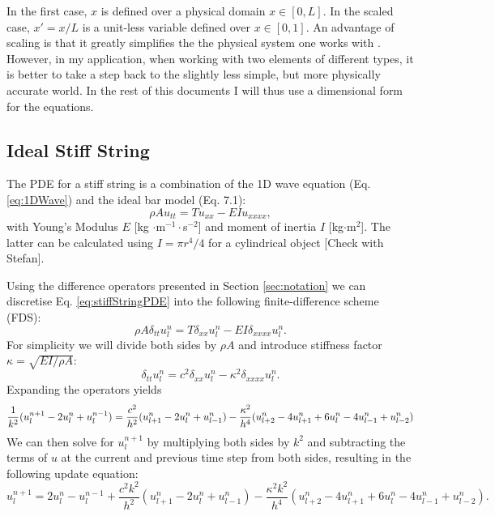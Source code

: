 \documentclass{article}
\begin{document}
In the first case, $x$ is defined over a physical domain $x\in[0,L]$. In the scaled case, $x' = x/L$ is a unit-less variable defined over $x\in[0,1]$. An advantage of scaling is that it greatly simplifies the the physical system one works with \cite{Bilbao2009}. However, in my application, when working with two  elements of different types, it is better to take a step back to the slightly less simple, but more physically accurate world. In the rest of this documents I will thus use a dimensional form for the equations.

\subsection{Ideal Stiff String}
The PDE for a stiff string is a combination of the 1D wave equation (Eq. \eqref{eq:1DWave}) and the ideal bar model (Eq. 7.1):
\begin{equation}\label{eq:stiffStringPDE}
    \rho A u_{tt} = T u_{xx} - EI u_{xxxx},
\end{equation}
with Young's Modulus $E$ [kg $\cdot$m$^{-1} \cdot$s$^{-2}$] and moment of inertia $I$ [kg$\cdot$m$^2$]. The latter can be calculated using $I = \pi r^4/4$ for a cylindrical object [Check with Stefan].

Using the difference operators presented in Section \ref{sec:notation} we can discretise Eq. \eqref{eq:stiffStringPDE} into the following finite-difference scheme (FDS):
\begin{equation}\label{eq:stiffStringFDS}
    \rho A \delta_{tt}u_l^n = T \delta_{xx} u_l^n - EI \delta_{xxxx} u_l^n.
\end{equation}
For simplicity we will divide both sides by $\rho A$ and introduce stiffness factor $\kappa = \sqrt{EI/\rho A}$:
\begin{equation}\label{eq:stiffStringFDSVars}
   \delta_{tt}u_l^n = c^2 \delta_{xx} u_l^n - \kappa^2 \delta_{xxxx} u_l^n.
\end{equation}
Expanding the operators yields
\begin{equation}
    \frac{1}{k^2}(u_l^{n+1}-2u_l^n+u_l^{n-1}) = \frac{c^2}{h^2}(u_{l+1}^n-2u_l^n+u_{l-1}^n)- \\
 \frac{\kappa^2}{h^4}(u_{l+2}^n-4u_{l+1}^n+6u_l^n-4u_{l-1}^n+u_{l-2}^n)
\end{equation}
We can then solve for $u_l^{n+1}$ by multiplying both sides by $k^2$ and subtracting the terms of $u$ at the current and previous time step from both sides, resulting in the following update equation:
\begin{equation}
    u_l^{n+1} = 2u_l^n-u_l^{n-1}+\frac{c^2k^2}{h^2}(u_{l+1}^n-2u_l^n+u_{l-1}^n)-\frac{\kappa^2k^2}{h^4}(u_{l+2}^n-4u_{l+1}^n+6u_l^n-4u_{l-1}^n+u_{l-2}^n).
\end{equation}
\end{document}

